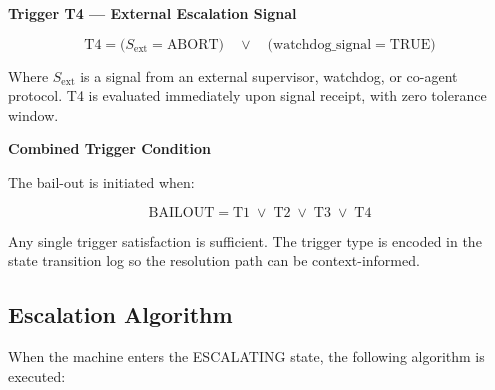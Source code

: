 \bigskip
\noindent\textbf{Trigger T4 — External Escalation Signal}

\begin{equation}
\text{T4} = \bigl(S_{\text{ext}} = \text{ABORT}\bigr) \quad \lor \quad \bigl(\text{watchdog\_signal} = \text{TRUE}\bigr)
\end{equation}

Where $S_{\text{ext}}$ is a signal from an external supervisor, watchdog, or co-agent protocol. T4 is evaluated immediately upon signal receipt, with zero tolerance window.

\bigskip
\bigskip
\noindent\textbf{Combined Trigger Condition}

The bail-out is initiated when:

\begin{equation}
\text{BAILOUT} = \text{T1} \;\lor\; \text{T2} \;\lor\; \text{T3} \;\lor\; \text{T4}
\tag{TC}
\end{equation}

Any single trigger satisfaction is sufficient. The trigger type is encoded in the state transition log so the resolution path can be context-informed.


\subsection{Escalation Algorithm}

When the machine enters the ESCALATING state, the following algorithm is executed:

